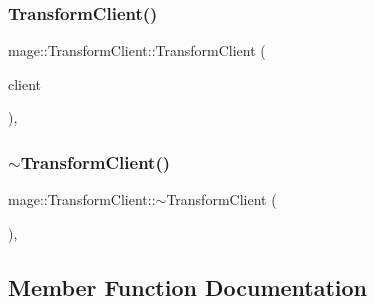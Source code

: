 \hypertarget{classmage_1_1_transform_client_aa6f9f3b26701748b3c7aa5b194ea6d5e}{}\label{classmage_1_1_transform_client_aa6f9f3b26701748b3c7aa5b194ea6d5e} 
\subsubsection{\texorpdfstring{Transform\+Client()}{TransformClient()}\hspace{0.1cm}{\footnotesize\ttfamily [3/3]}}
{\footnotesize\ttfamily mage\+::\+Transform\+Client\+::\+Transform\+Client (\begin{DoxyParamCaption}\item[{\hyperlink{classmage_1_1_transform_client}{Transform\+Client} \&\&}]{client }\end{DoxyParamCaption})\hspace{0.3cm}{\ttfamily [private]}, {\ttfamily [delete]}}

\hypertarget{classmage_1_1_transform_client_acc5960c1dd23ec86574a99b68023dde3}{}\label{classmage_1_1_transform_client_acc5960c1dd23ec86574a99b68023dde3} 
\subsubsection{\texorpdfstring{$\sim$\+Transform\+Client()}{~TransformClient()}}
{\footnotesize\ttfamily mage\+::\+Transform\+Client\+::$\sim$\+Transform\+Client (\begin{DoxyParamCaption}{ }\end{DoxyParamCaption})\hspace{0.3cm}{\ttfamily [private]}, {\ttfamily [delete]}}



\subsection{Member Function Documentation}
\hypertarget{classmage_1_1_transform_client_a6b2ff0d0e14dbd42a26159547fd1e6b4}{}\label{classmage_1_1_transform_client_a6b2ff0d0e14dbd42a26159547fd1e6b4} 
